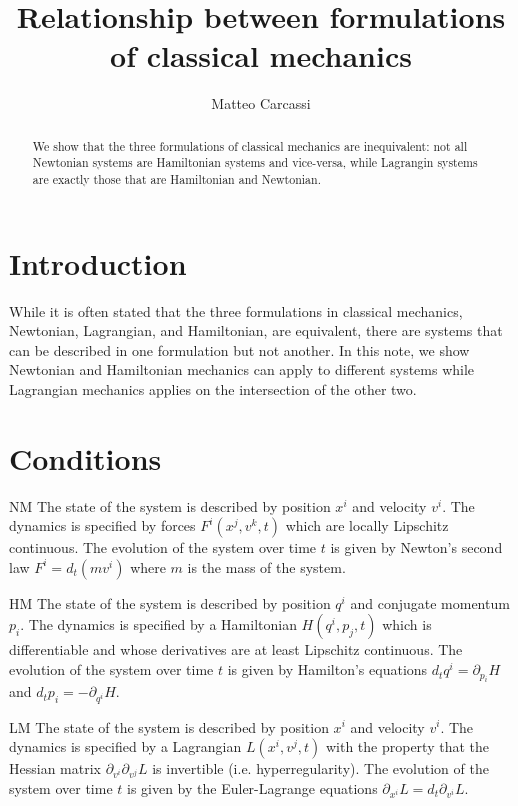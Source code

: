 \documentclass{techbrief}
\title{Relationship between formulations of classical mechanics}
\author{Matteo Carcassi}
\begin{document}
	
	\maketitle
	
	\begin{abstract}
		We show that the three formulations of classical mechanics are inequivalent: not all Newtonian systems are Hamiltonian systems and vice-versa, while Lagrangin systems are exactly those that are Hamiltonian and Newtonian.
	\end{abstract}
	
	\section{Introduction}
	While it is often stated that the three formulations in classical mechanics, Newtonian, Lagrangian, and Hamiltonian, are equivalent, there are systems that can be described in one formulation but not another. In this note, we show Newtonian and Hamiltonian mechanics can apply to different systems while Lagrangian mechanics applies on the intersection of the other two.
	
	\section{Conditions}
		\begin{condition}{NM}
			The state of the system is described by position $x^{i}$ and velocity $v^{i}$. The dynamics is specified by forces $F^{i}(x^{j},v^{k},t)$ which are locally Lipschitz continuous. The evolution of the system over time $t$ is given by Newton's second law $F^{i} = d_{t}(mv^{i})$ where $m$ is the mass of the system.
		\end{condition}
		
		\begin{condition}{HM}
			The state of the system is described by position $q^{i}$ and conjugate momentum $p_{i}$. The dynamics is specified by a Hamiltonian $H(q^{i},p_{j},t)$ which is differentiable and whose derivatives are at least Lipschitz continuous. The evolution of the system over time $t$ is given by Hamilton's equations $d_{t}q^{i} = \partial_{p_{i}}H$ and $d_{t}p_{i} = -\partial_{q^{i}}H$.
		\end{condition}
		
		\begin{condition}{LM}
			The state of the system is described by position $x^{i}$ and velocity $v^{i}$. The dynamics is specified by a Lagrangian $L(x^{i},v^{j},t)$ with the property that the Hessian matrix $\partial_{v^{i}}\partial_{v^{j}}L$ is invertible (i.e. hyperregularity). The evolution of the system over time $t$ is given by the Euler-Lagrange equations $\partial_{x^{i}}L = d_{t}\partial_{v^{i}}L$.
		\end{condition}
	
\end{document}
